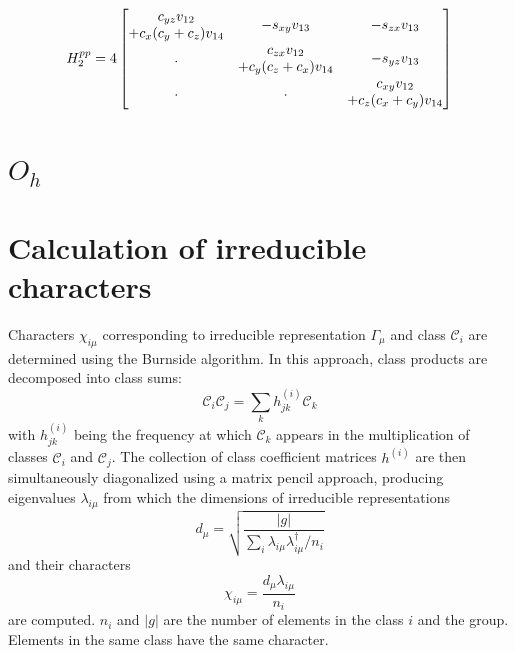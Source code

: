 \documentclass[twocolumn,showpacs,preprintnumbers,superscriptaddress,prb,floatfix,aps,10pt]{revtex4-1}
\newcommand*{\class}{\mathcal{C}}
\begin{document}
\begin{equation}
H^{pp}_2 =  4
\begin{bmatrix}
              c_{yz} v_{12} & \multirow{2}{*}{$-s_{xy} v_{13}$} & \multirow{2}{*}{$-s_{zx} v_{13}$}  \\
+c_{x} (c_{y}+c_{z}) v_{14} &                                   &                                    \\
\multirow{2}{*}{.}          &               c_{zx} v_{12}       & \multirow{2}{*}{$-s_{yz} v_{13}$}  \\
                            & +c_{y} (c_{z}+c_{x}) v_{14}       &                                    \\
\multirow{2}{*}{.}          & \multirow{2}{*}{.}                &          c_{xy} v_{12}             \\ 
                            &                                   &        +c_{z} (c_{x}+c_{y}) v_{14} \\
\end{bmatrix}
\end{equation}






\section{$O_h$}
\label{appendix:pg}
\section{Calculation of irreducible characters}
\label{appendix:chartab}
Characters $\chi_{i\mu}$ corresponding to irreducible representation $\Gamma_\mu$ and class $\class_i$ are determined using the Burnside algorithm.\cite{burnside_theory_2010,mckay_construction_1970,unger_computing_2006,schneider_dixons_1990,dixon_high_1967} In this approach, class products are decomposed into class sums:
\begin{equation}
\label{eq:class_coefficients}
\class_i \class_j = \sum_k h_{jk}^{(i)} \class_k
\end{equation}
with $h_{jk}^{(i)}$ being the frequency at which $\class_k$ appears in the multiplication of classes $\class_i$ and $\class_j$. The collection of class coefficient matrices $h^{(i)}$ are then simultaneously diagonalized using a matrix pencil approach, producing eigenvalues $\lambda_{i\mu}$ from which the dimensions of irreducible representations
\begin{equation}
\label{eq:irrep_dimension}
d_\mu = \sqrt{ \frac{|g|}{\sum_i \lambda_{i\mu} \lambda^{\dag}_{i\mu} / n_i }  }
\end{equation}
and their characters
\begin{equation}
\label{eq:irrep_characters}
\chi_{i\mu} = \frac{d_\mu \lambda_{i\mu}}{n_i}
\end{equation}
are computed. $n_i$ and $|g|$ are the number of elements in the class $i$ and the group. Elements in the same class have the same character.
\end{document}
